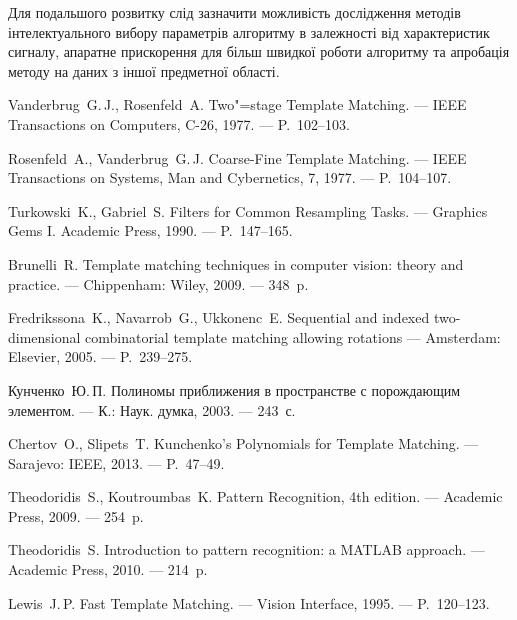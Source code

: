 \documentclass{thesis_utf8}
\begin{document}
Для подальшого розвитку слід зазначити можливість дослідження методів інтелектуального вибору параметрів алгоритму в
залежності від характеристик сигналу, апаратне прискорення для більш швидкої роботи алгоритму та апробація методу на
даних з іншої предметної області.

\begin{thebibliography}
    Vanderbrug~G.\,J., Rosenfeld~A. Two"=stage Template Matching. --- IEEE Transactions on Computers, C-26, 1977. ---
    P.~102--103.

    Rosenfeld~A., Vanderbrug~G.\,J. Coarse-Fine Template Matching. --- IEEE Transactions on Systems, Man and
    Cybernetics, 7, 1977. --- P.~104--107.

    Turkowski~K., Gabriel~S. Filters for Common Resampling Tasks. --- Graphics Gems I. Academic Press, 1990. ---
    P.~147--165.

    Brunelli~R. Template matching techniques in computer vision: theory and practice. --- Chippenham: Wiley, 2009. ---
    348~p.

    Fredrikssona~K., Navarrob~G., Ukkonenc~E. Sequential and indexed two-dimensional combinatorial template matching
    allowing rotations --- Amsterdam: Elsevier, 2005. --- P.~239--275.

    Кунченко~Ю.\,П. Полиномы приближения в пространстве с порождающим элементом. --- К.: Наук. думка, 2003. --- 243~с.

    Chertov~O., Slipets~T. Kunchenko's Polynomials for Template Matching. --- Sarajevo: IEEE, 2013. --- P.~47--49.

    Theodoridis~S., Koutroumbas~K. Pattern Recognition, 4th edition. --- Academic Press, 2009. --- 254~p.

    Theodoridis~S. Introduction to pattern recognition: a MATLAB\textsuperscript{\textregistered} approach. ---
    Academic Press, 2010. --- 214~p.

    Lewis~J.\,P. Fast Template Matching. --- Vision Interface, 1995. --- P.~120--123.


\end{thebibliography}
\end{document}
